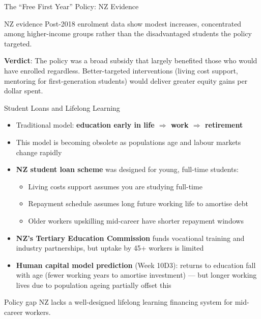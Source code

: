 \documentclass[aspectratio=169, 12pt]{beamer}
\begin{document}
\begin{frame}{The ``Free First Year'' Policy: NZ Evidence}
  \begin{exampleblock}{NZ evidence}
    Post-2018 enrolment data show modest increases, concentrated among higher-income groups
    rather than the disadvantaged students the policy targeted.
  \end{exampleblock}
  \vspace{0.5em}
  \small
  \textbf{Verdict}: The policy was a broad subsidy that largely benefited those who would
  have enrolled regardless. Better-targeted interventions (living cost support, mentoring
  for first-generation students) would deliver greater equity gains per dollar spent.
\end{frame}

\begin{frame}{Student Loans and Lifelong Learning}
  \footnotesize
  \begin{itemize}
    \item Traditional model: \textbf{education early in life $\Rightarrow$ work $\Rightarrow$ retirement}
    \item This model is becoming obsolete as populations age and labour markets change rapidly
    \item \textbf{NZ student loan scheme} was designed for young, full-time students:
    \begin{itemize}
      \item Living costs support assumes you are studying full-time
      \item Repayment schedule assumes long future working life to amortise debt
      \item Older workers upskilling mid-career have shorter repayment windows
    \end{itemize}
    \item \textbf{NZ's Tertiary Education Commission} funds vocational training and industry
          partnerships, but uptake by 45+ workers is limited
    \item \textbf{Human capital model prediction} (Week 10D3): returns to education fall with age
          (fewer working years to amortise investment) --- but longer working lives due to
          population ageing partially offset this
  \end{itemize}
  \begin{alertblock}{Policy gap}
    \footnotesize NZ lacks a well-designed lifelong learning financing system for mid-career workers.
  \end{alertblock}
\end{frame}
\end{document}
